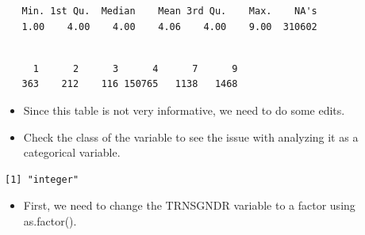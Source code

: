 \documentclass[
  letterpaper,
  DIV=11,
  numbers=noendperiod]{scrreprt}
\newenvironment{Shaded}{\begin{snugshade}}{\end{snugshade}}
\newcommand{\CommentTok}[1]{\textcolor[rgb]{0.37,0.37,0.37}{#1}}
\newcommand{\FunctionTok}[1]{\textcolor[rgb]{0.28,0.35,0.67}{#1}}
\newcommand{\NormalTok}[1]{\textcolor[rgb]{0.00,0.23,0.31}{#1}}
\newcommand{\OtherTok}[1]{\textcolor[rgb]{0.00,0.23,0.31}{#1}}
\newcommand{\SpecialCharTok}[1]{\textcolor[rgb]{0.37,0.37,0.37}{#1}}
\providecommand{\tightlist}{%
  \setlength{\itemsep}{0pt}\setlength{\parskip}{0pt}}\usepackage{longtable,booktabs,array}
\begin{document}
\begin{verbatim}
   Min. 1st Qu.  Median    Mean 3rd Qu.    Max.    NA's 
   1.00    4.00    4.00    4.06    4.00    9.00  310602 
\end{verbatim}

\begin{Shaded}
\end{Shaded}

\begin{verbatim}

     1      2      3      4      7      9 
   363    212    116 150765   1138   1468 
\end{verbatim}

\begin{itemize}
\tightlist
\item
  Since this table is not very informative, we need to do some edits.
\item
  Check the class of the variable to see the issue with analyzing it as
  a categorical variable.
\end{itemize}

\begin{Shaded}
\end{Shaded}

\begin{verbatim}
[1] "integer"
\end{verbatim}

\begin{itemize}
\tightlist
\item
  First, we need to change the TRNSGNDR variable to a factor using
  as.factor().
\end{itemize}

\begin{Shaded}
\end{Shaded}
\end{document}

